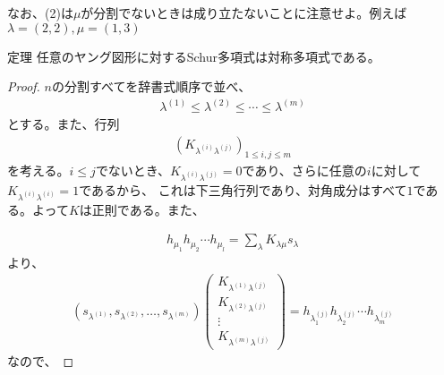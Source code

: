 \documentclass[a4paper,11pt]{jsarticle}
\theoremstyle{plain}
\theoremstyle{definition}
\renewcommand{\(}{\left(}
\renewcommand{\)}{\right)}
\renewcommand{\[}{\left[}
\renewcommand{\]}{\right]}
\renewcommand{\{}{\left\lbrace}
\renewcommand{\}}{\right\rbrace}
\newcommand{\pmat}[1]{\begin{pmatrix} #1 \end{pmatrix}}
\begin{document}
なお、(2)は$\mu$が分割でないときは成り立たないことに注意せよ。例えば$\lambda = (2,2), \mu = (1,3)$


\begin{itembox}[l]{定理}
    任意のヤング図形に対するSchur多項式は対称多項式である。
\end{itembox}

\begin{proof}

    $n$の分割すべてを辞書式順序で並べ、
    \begin{align*}
        \lambda^{(1)} \leq \lambda^{(2)} \leq \cdots \leq \lambda^{(m)}
    \end{align*}
    とする。また、行列
    \begin{align*}
        (K_{\lambda^{(i)} \lambda^{(j)}})_{{1 \leq i,j \leq m}}
    \end{align*}
    を考える。$i \leq j$でないとき、$K_{\lambda^{(i)} \lambda^{(j)}} = 0$であり、さらに任意の$i$に対して$K_{\lambda^{(i)} \lambda^{(i)}} = 1$であるから、
    これは下三角行列であり、対角成分はすべて$1$である。よって$K$は正則である。また、

    \begin{align*}
        h_{\mu_1}h_{\mu_2}\cdots h_{\mu_l} = \sum_{\lambda} K_{\lambda \mu} s_{\lambda}
    \end{align*}
    より、
    \begin{align*}
        (s_{\lambda^{(1)}}, s_{\lambda^{(2)}}, \ldots, s_{\lambda^{(m)}}) \pmat{K_{\lambda^{(1)} \lambda^{(j)}} \\ K_{\lambda^{(2)} \lambda^{(j)}} \\ \vdots \\ K_{\lambda^{(m)} \lambda^{(j)}}} = h_{\lambda^{(j)}_1} h_{\lambda^{(j)}_2} \cdots h_{\lambda^{(j)}_m}
    \end{align*}
    なので、


\end{proof}
\end{document}
